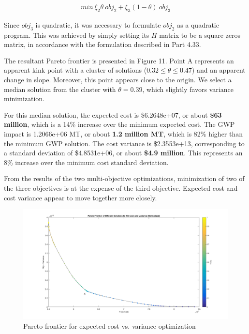 \documentclass{article}
\begin{document}
	\begin{align*}
		min \  \xi_2 \theta \ obj_2  + \xi_3 (1-\theta) \ obj_3 
	\end{align*}
	
	Since $obj_3$ is quadratic, it was necessary to formulate $obj_2$ as a quadratic program. This was achieved by simply setting its $H$ matrix to be a square zeros matrix, in accordance with the formulation described in Part 4.33. 
	
	The resultant Pareto frontier is presented in Figure 11. Point A represents an apparent kink point with a cluster of solutions ($0.32 \leq \theta \leq 0.47$) and an apparent change in slope. Moreover, this point appears close to the origin. We select a median solution from the cluster with $\theta = 0.39$, which slightly favors variance minimization.
	
	For this median solution, the expected cost is \$6.2648e+07, or about \textbf{\$63 million}, which is a 14\% increase over the minimum expected cost. The GWP impact is 1.2066e+06 MT, or about \textbf{1.2 million MT}, which is 82\% higher than the minimum GWP solution. The cost variance is \$2.3553e+13, corresponding to a standard deviation of \$4.8531e+06, or about \textbf{\$4.9 million}. This represents an 8\% increase over the minimum cost standard deviation.
	
	From the results of the two multi-objective optimizations, minimization of two of the three objectives is at the expense of the third objective. Expected cost and cost variance appear to move together more closely.
	
	\begin{figure}
		\includegraphics[width=\textwidth]{434_11_cost_var_pareto}
		\caption{Pareto frontier for expected cost vs. variance optimization}
	\end{figure}
	
\end{document}
